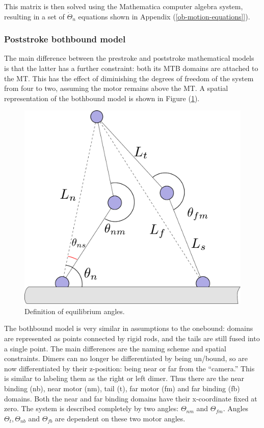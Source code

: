 \documentclass[10pt]{article} %
\begin{document}
This matrix is then solved using the Mathematica computer algebra system, resulting in a set of $\dot{\Theta}_n$ equations shown in Appendix (\ref{ob-motion-equations]}).

\subsubsection{Poststroke bothbound model}
The main difference between the prestroke and poststroke mathematical models is that the latter has a further constraint: both its MTB domains are attached to the MT. This has the effect of diminishing the degrees of freedom of the system from four to two, assuming the motor remains above the MT. A spatial representation of the bothbound model is shown in Figure (\ref{bb_fig}).\\

\begin{figure}[h]
  \centering
  \includegraphics[width=.45\textwidth]{../../figures/code-bothbound.pdf}
  \caption{Definition of equilibrium angles.}
  \label{bb_fig}
\end{figure}

The bothbound model is very similar in assumptions to the onebound: domains are represented as points connected by rigid rods, and the tails are still fused into a single point. The main differences are the naming scheme and spatial constraints. Dimers can no longer be differentiated by being un/bound, so are now differentiated by their z-position: being near or far from the ``camera.'' This is similar to labeling them as the right or left dimer. Thus there are the near binding (nb), near motor (nm), tail (t), far motor (fm) and far binding (fb) domains. Both the near and far binding domains have their x-coordinate fixed at zero. The system is described completely by two angles: $\Theta_{nm}$ and $\Theta_{fm}$. Angles $\Theta_t, \Theta_{nb}$ and $\Theta_{fb}$ are dependent on these two motor angles.\\
\end{document}
